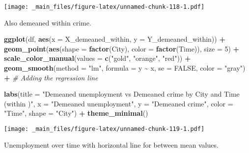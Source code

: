 \documentclass[
]{book}
\newenvironment{Shaded}{\begin{snugshade}}{\end{snugshade}}
\newcommand{\AttributeTok}[1]{\textcolor[rgb]{0.13,0.29,0.53}{#1}}
\newcommand{\CommentTok}[1]{\textcolor[rgb]{0.56,0.35,0.01}{\textit{#1}}}
\newcommand{\ConstantTok}[1]{\textcolor[rgb]{0.56,0.35,0.01}{#1}}
\newcommand{\DecValTok}[1]{\textcolor[rgb]{0.00,0.00,0.81}{#1}}
\newcommand{\FunctionTok}[1]{\textcolor[rgb]{0.13,0.29,0.53}{\textbf{#1}}}
\newcommand{\NormalTok}[1]{#1}
\newcommand{\SpecialCharTok}[1]{\textcolor[rgb]{0.81,0.36,0.00}{\textbf{#1}}}
\newcommand{\StringTok}[1]{\textcolor[rgb]{0.31,0.60,0.02}{#1}}
\begin{document}
\texttt{[image: \_main\_files/figure-latex/unnamed-chunk-118-1.pdf]}

Also demeaned within crime.

\begin{Shaded}
\begin{Highlighting}[]
\FunctionTok{ggplot}\NormalTok{(df, }\FunctionTok{aes}\NormalTok{(}\AttributeTok{x =}\NormalTok{ X\_demeaned\_within, }\AttributeTok{y =}\NormalTok{ Y\_demeaned\_within)) }\SpecialCharTok{+}
  \FunctionTok{geom\_point}\NormalTok{(}\FunctionTok{aes}\NormalTok{(}\AttributeTok{shape =} \FunctionTok{factor}\NormalTok{(City), }\AttributeTok{color =} \FunctionTok{factor}\NormalTok{(Time)), }\AttributeTok{size =} \DecValTok{5}\NormalTok{) }\SpecialCharTok{+}
  \FunctionTok{scale\_color\_manual}\NormalTok{(}\AttributeTok{values =} \FunctionTok{c}\NormalTok{(}\StringTok{"gold"}\NormalTok{, }\StringTok{"orange"}\NormalTok{, }\StringTok{"red"}\NormalTok{)) }\SpecialCharTok{+}
  \FunctionTok{geom\_smooth}\NormalTok{(}\AttributeTok{method =} \StringTok{"lm"}\NormalTok{, }\AttributeTok{formula =}\NormalTok{ y }\SpecialCharTok{\textasciitilde{}}\NormalTok{ x, }\AttributeTok{se =} \ConstantTok{FALSE}\NormalTok{, }\AttributeTok{color =} \StringTok{"gray"}\NormalTok{) }\SpecialCharTok{+}  \CommentTok{\# Adding the regression line}

  \FunctionTok{labs}\NormalTok{(}\AttributeTok{title =} \StringTok{"Demeaned unemployment vs Demeaned crime by City and Time (within )"}\NormalTok{,}
       \AttributeTok{x =} \StringTok{"Demeaned unemployment"}\NormalTok{,}
       \AttributeTok{y =} \StringTok{"Demeaned crime"}\NormalTok{,}
       \AttributeTok{color =} \StringTok{"Time"}\NormalTok{,}
       \AttributeTok{shape =} \StringTok{"City"}\NormalTok{) }\SpecialCharTok{+}
  \FunctionTok{theme\_minimal}\NormalTok{()}
\end{Highlighting}
\end{Shaded}

\texttt{[image: \_main\_files/figure-latex/unnamed-chunk-119-1.pdf]}

Unemployment over time with horizontal line for between mean values.
\end{document}
